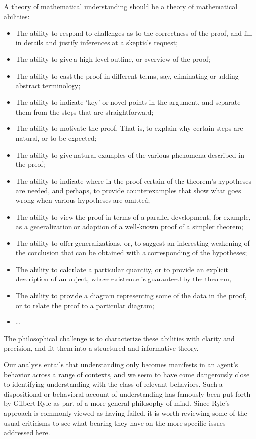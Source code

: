 \documentclass{article}
\begin{document}
A theory of mathematical understanding should be a theory of mathematical
abilities:
\begin{itemize}
\item The ability to respond to challenges as to the correctness of the proof,
and fill in details and justify inferences at a skeptic's request;
\item The ability to give a high-level outline, or overview of the proof;
\item The ability to cast the proof in different terms, say, eliminating or
adding abstract terminology;
\item The ability to indicate `key' or novel points in the argument, and
separate them from the steps that are straightforward;
\item The ability to motivate the proof. That is, to explain why certain steps
are natural, or to be expected;
\item The ability to give natural examples of the various phenomena described in
the proof;
\item The ability to indicate where in the proof certain of the theorem's
hypotheses are needed, and perhaps, to provide counterexamples that show what
goes wrong when various hypotheses are omitted;
\item The ability to view the proof in terms of a parallel development, for
example, as a generalization or adaption of a well-known proof of a simpler
theorem;
\item The ability to offer generalizations, or, to suggest an interesting
weakening of the conclusion that can be obtained with a corresponding of the
hypotheses;
\item The ability to calculate a particular quantity, or to provide an explicit
description of an object, whose existence is guaranteed by the theorem;
\item The ability to provide a diagram representing some of the data in the
proof, or to relate the proof to a particular diagram;
\item \ldots
\end{itemize}
The philosophical challenge is to characterize these abilities with clarity and
precision, and fit them into a structured and informative theory.

Our analysis entails that understanding only becomes manifests in an agent's
behavior across a range of contexts, and we seem to have come dangerously close
to identifying understanding with the class of relevant behaviors. Such a
dispositional or behavioral account of understanding has famously been put
forth by Gilbert Ryle as part of a more general philosophy of mind. Since Ryle's
approach is commonly viewed as having failed, it is worth reviewing some of the
usual criticisms to see what bearing they have on the more specific issues 
addressed here.
\end{document}
